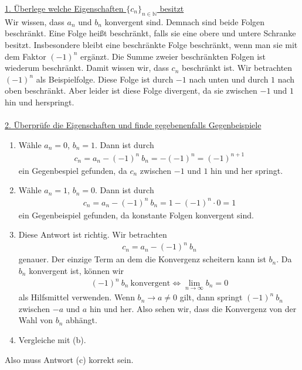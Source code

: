 \underline{1. Überlege  welche Eigenschaften $\lbrace c_n\rbrace_{ n\in \mathbb{N}}$ besitzt}\\
Wir wissen, dass $a_n$ und $b_n$ konvergent sind. Demnach sind beide Folgen beschränkt.
Eine Folge heißt beschränkt, falls sie eine obere und untere Schranke besitzt.
Insbesondere bleibt eine beschränkte Folge beschränkt, wenn man sie mit dem Faktor $(-1)^n$ ergänzt. Die Summe zweier beschränkten Folgen ist wiederum beschränkt.
Damit wissen wir, dass $c_n$ beschränkt ist.
Wir betrachten $(-1)^n$ als Beispielfolge.
Diese Folge ist durch $-1$ nach unten und durch $1$ nach oben beschränkt.
Aber leider ist diese Folge divergent, da sie zwischen $-1$ und $1$ hin und herspringt.
\\
\\
\underline{2. Überprüfe die Eigenschaften und finde gegebenenfalls Gegenbeispiele}\\
\renewcommand{\labelenumi}{(\alph{enumi})}
\begin{enumerate}
\item Wähle $a_n = 0$, $b_n = 1$.
Dann ist durch
\begin{align*}
c_n = a_n - (-1)^n \ b_n = -(-1)^n = (-1)^{n+1}
\end{align*}
ein Gegenbespiel gefunden, da $c_n$ zwischen $-1$ und $1$ hin und her springt.
\item Wähle $a_n = 1$, $b_n = 0$.
Dann ist durch
\begin{align*}
c_n = a_n - (-1)^n \ b_n 
= 1 - (-1)^n \cdot 0 = 1
\end{align*}
ein Gegenbeispiel gefunden, da konstante Folgen konvergent sind.

\item
Diese Antwort ist richtig. Wir betrachten
\begin{align*}
c_n = a_n - (-1)^n \ b_n 
\end{align*}
genauer.
Der einzige Term an dem die Konvergenz scheitern kann ist $b_n$.
Da $b_n$ konvergent ist, können wir 
\begin{align*}
(-1)^n  \ b_n \ \text{konvergent} 
\Leftrightarrow
\lim \limits_{n \rightarrow \infty} b_n = 0
\end{align*}
als Hilfsmittel verwenden.
Wenn $b_n \rightarrow a \neq 0 $ gilt, dann springt $(-1)^n \ b_n $ zwischen $-a$ und $a$ hin und her.
Also sehen wir, dass die Konvergenz von der Wahl von $b_n$ abhängt.

\item
Vergleiche mit (b).
\end{enumerate}
Also muss Antwort (c) korrekt sein.
\newpage

